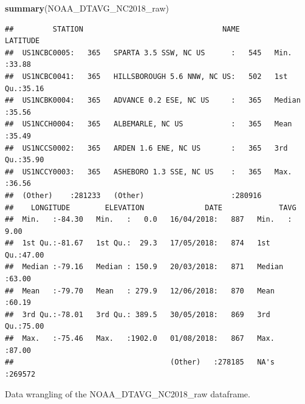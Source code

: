 \documentclass[12pt,]{article}
\newenvironment{Shaded}{\begin{snugshade}}{\end{snugshade}}
\newcommand{\KeywordTok}[1]{\textcolor[rgb]{0.13,0.29,0.53}{\textbf{#1}}}
\newcommand{\DataTypeTok}[1]{\textcolor[rgb]{0.13,0.29,0.53}{#1}}
\newcommand{\DecValTok}[1]{\textcolor[rgb]{0.00,0.00,0.81}{#1}}
\newcommand{\StringTok}[1]{\textcolor[rgb]{0.31,0.60,0.02}{#1}}
\newcommand{\CommentTok}[1]{\textcolor[rgb]{0.56,0.35,0.01}{\textit{#1}}}
\newcommand{\OperatorTok}[1]{\textcolor[rgb]{0.81,0.36,0.00}{\textbf{#1}}}
\newcommand{\NormalTok}[1]{#1}
\begin{document}
\begin{Shaded}
\begin{Highlighting}[]
\KeywordTok{summary}\NormalTok{(NOAA_DTAVG_NC2018_raw)}
\end{Highlighting}
\end{Shaded}

\begin{verbatim}
##         STATION                                NAME           LATITUDE    
##  US1NCBC0005:   365   SPARTA 3.5 SSW, NC US      :   545   Min.   :33.88  
##  US1NCBC0041:   365   HILLSBOROUGH 5.6 NNW, NC US:   502   1st Qu.:35.16  
##  US1NCBK0004:   365   ADVANCE 0.2 ESE, NC US     :   365   Median :35.56  
##  US1NCCH0004:   365   ALBEMARLE, NC US           :   365   Mean   :35.49  
##  US1NCCS0002:   365   ARDEN 1.6 ENE, NC US       :   365   3rd Qu.:35.90  
##  US1NCCY0003:   365   ASHEBORO 1.3 SSE, NC US    :   365   Max.   :36.56  
##  (Other)    :281233   (Other)                    :280916                  
##    LONGITUDE        ELEVATION              DATE             TAVG       
##  Min.   :-84.30   Min.   :   0.0   16/04/2018:   887   Min.   : 9.00   
##  1st Qu.:-81.67   1st Qu.:  29.3   17/05/2018:   874   1st Qu.:47.00   
##  Median :-79.16   Median : 150.9   20/03/2018:   871   Median :63.00   
##  Mean   :-79.70   Mean   : 279.9   12/06/2018:   870   Mean   :60.19   
##  3rd Qu.:-78.01   3rd Qu.: 389.5   30/05/2018:   869   3rd Qu.:75.00   
##  Max.   :-75.46   Max.   :1902.0   01/08/2018:   867   Max.   :87.00   
##                                    (Other)   :278185   NA's   :269572
\end{verbatim}

Data wrangling of the NOAA\_DTAVG\_NC2018\_raw dataframe.

\begin{Shaded}
\end{Shaded}
\end{document}
